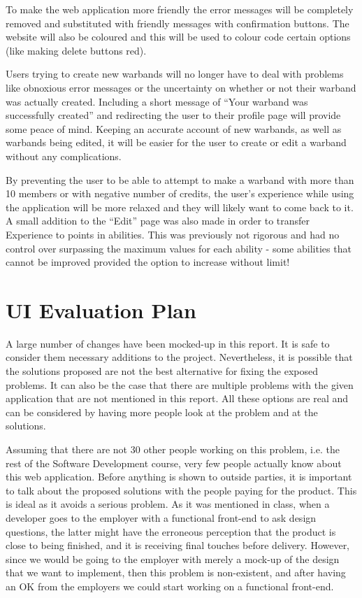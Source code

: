 \documentclass[12pt,a4paper]{article}
\begin{document}
To make the web application more friendly the error messages will be completely removed and substituted with friendly messages with confirmation buttons. The website will also be coloured and this will be used to colour code certain options (like making delete buttons red).

Users trying to create new warbands will no longer have to deal with problems like obnoxious error messages or the uncertainty on whether or not their warband was actually created. Including a short message of ``Your warband was successfully created'' and redirecting the user to their profile page will provide some peace of mind. Keeping an accurate account of new warbands, as well as warbands being edited, it will be easier for the user to create or edit a warband without any complications. 

By preventing the user to be able to attempt to make a warband with more than 10 members or with negative number of credits, the user's experience while using the application will be more relaxed and they will likely want to come back to it. A small addition to the ``Edit'' page was also made in order to transfer Experience to points in abilities. This was previously not rigorous and had no control over surpassing the maximum values for each ability - some abilities that cannot be improved provided the option to increase without limit! 



\section{UI Evaluation Plan}

A large number of changes have been mocked-up in this report. It is safe to consider them necessary additions to the project. Nevertheless, it is possible that the solutions proposed are not the best alternative for fixing the exposed problems. It can also be the case that there are multiple problems with the given application that are not mentioned in this report. All these options are real and can be considered by having more people look at the problem and at the solutions. 

Assuming that there are not 30 other people working on this problem, i.e. the rest of the Software Development course, very few people actually know about this web application. Before anything is shown to outside parties, it is important to talk about the proposed solutions with the people paying for the product. This is ideal as it avoids a serious problem. As it was mentioned in class, when a developer goes to the employer with a functional front-end to ask design questions, the latter might have the erroneous perception that the product is close to being finished, and it is receiving final touches before delivery. However, since we would be going to the employer with merely a mock-up of the design that we want to implement, then this problem is non-existent, and after having an OK from the employers we could start working on a functional front-end.
\end{document}
